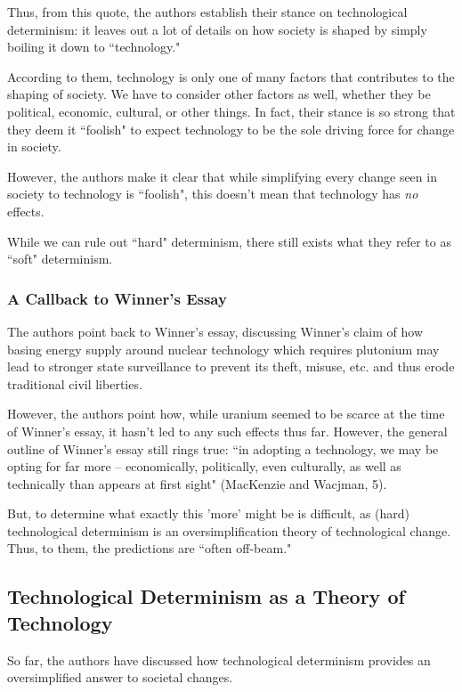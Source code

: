 \documentclass[openany]{book}
\begin{document}
Thus, from this quote, the authors establish their stance on technological determinism: it leaves out a lot of details on how society is shaped by simply boiling it down to ``technology."

According to them, technology is only one of many factors that contributes to the shaping of society. We have to consider other factors as well, whether they be political, economic, cultural, or other things. In fact, their stance is so strong that they deem it ``foolish" to expect technology to be the sole driving force for change in society.

\begin{warn}
	However, the authors make it clear that while simplifying every change seen in society to technology is ``foolish", this doesn't mean that technology has \textit{no} effects.
	
	While we can rule out ``hard" determinism, there still exists what they refer to as ``soft" determinism.
\end{warn}

\subsubsection{A Callback to Winner's Essay}
The authors point back to Winner's essay, discussing Winner's claim of how basing energy supply around nuclear technology which requires plutonium may lead to stronger state surveillance to prevent its theft, misuse, etc. and thus erode traditional civil liberties.

However, the authors point how, while uranium seemed to be scarce at the time of Winner's essay, it hasn't led to any such effects thus far. However, the general outline of Winner's essay still rings true: ``in adopting a technology, we may be opting for far more -- economically, politically, even culturally, as well as technically than appears at first sight" (MacKenzie and Wacjman, 5).

But, to determine what exactly this 'more' might be is difficult, as (hard) technological determinism is an oversimplification theory of technological change. Thus, to them, the predictions are ``often off-beam."

\subsection{Technological Determinism as a Theory of Technology}
So far, the authors have discussed how technological determinism provides an oversimplified answer to societal changes. 
\end{document}
